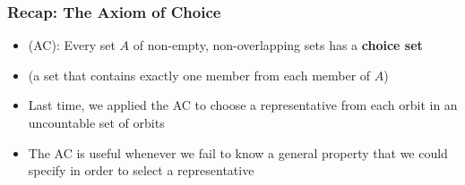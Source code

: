 \begin{frame}
\frametitle{Recap: The Axiom of Choice}

\begin{itemize}[<+->]

\item {} (AC): Every set $A$ of non-empty, non-overlapping sets has a \textbf{choice set} 
\item[] (a set that contains exactly one member from each member of $A$)

\item Last time, we applied the AC to choose a representative from each orbit in an uncountable set of orbits

\item The AC is useful whenever we fail to know a general property that we could specify in order to select a representative


\end{itemize}
\end{frame}

